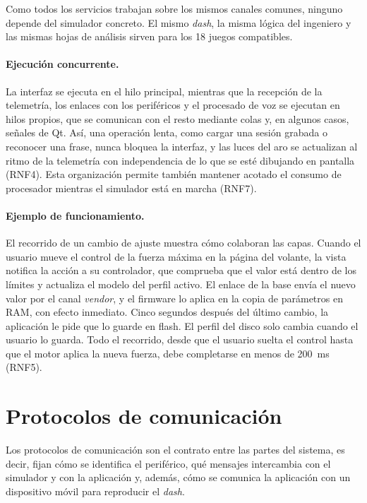 Como todos los servicios trabajan sobre los mismos canales comunes, ninguno depende del simulador concreto. El mismo \textit{dash}, la misma lógica del ingeniero y las mismas hojas de análisis sirven para los 18 juegos compatibles.

\paragraph{Ejecución concurrente.}
La interfaz se ejecuta en el hilo principal, mientras que la recepción de la telemetría, los enlaces con los periféricos y el procesado de voz se ejecutan en hilos propios, que se comunican con el resto mediante colas y, en algunos casos, señales de Qt. Así, una operación lenta, como cargar una sesión grabada o reconocer una frase, nunca bloquea la interfaz, y las luces del aro se actualizan al ritmo de la telemetría con independencia de lo que se esté dibujando en pantalla (RNF4). Esta organización permite también mantener acotado el consumo de procesador mientras el simulador está en marcha (RNF7).

\paragraph{Ejemplo de funcionamiento.}
El recorrido de un cambio de ajuste muestra cómo colaboran las capas. Cuando el usuario mueve el control de la fuerza máxima en la página del volante, la vista notifica la acción a su controlador, que comprueba que el valor está dentro de los límites y actualiza el modelo del perfil activo. El enlace de la base envía el nuevo valor por el canal \textit{vendor}, y el firmware lo aplica en la copia de parámetros en RAM, con efecto inmediato. Cinco segundos después del último cambio, la aplicación le pide que lo guarde en flash. El perfil del disco solo cambia cuando el usuario lo guarda. Todo el recorrido, desde que el usuario suelta el control hasta que el motor aplica la nueva fuerza, debe completarse en menos de 200~ms (RNF5).

\section{Protocolos de comunicación}
\label{sec:protocolos}
Los protocolos de comunicación son el contrato entre las partes del sistema, es decir, fijan cómo se identifica el periférico, qué mensajes intercambia con el simulador y con la aplicación y, además, cómo se comunica la aplicación con un dispositivo móvil para reproducir el \textit{dash}.


